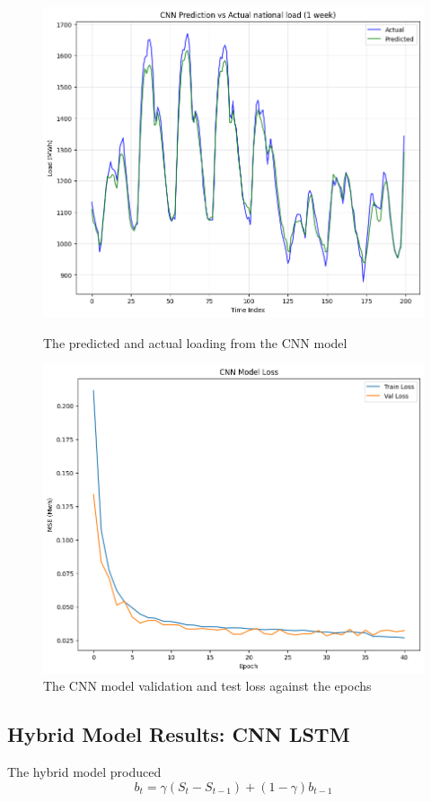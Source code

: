 \begin{figure}[h]
	\centering
	\begin{minipage}[b]{0.46\linewidth}
	\includegraphics[width=\linewidth]{Chapters/images/results/cnn_predictionvsactual}
	\caption{The predicted and actual loading from the CNN model}
	\label{fig:cnnpredictionvsactual}
	\end{minipage}
	\begin{minipage}[b]{0.46\linewidth}
	\includegraphics[width=\linewidth]{Chapters/images/results/CNN_model_loss}
	\caption{The CNN model validation and test loss against the epochs}
	\label{fig:cnnmodelloss}
	\end{minipage}
\end{figure}

\subsection{Hybrid Model Results: CNN LSTM}
 The hybrid model produced 
 \[
 b_t = \gamma (S_t - S_{t-1}) + (1-\gamma) b_{t-1}
 \tag{13}
 \label{eqn:877}
 \]


